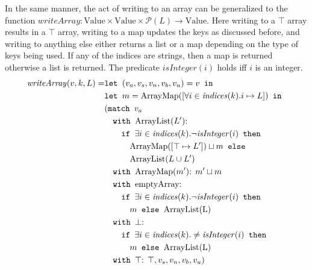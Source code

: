 In the same manner, the act of writing to an array can be generalized to the function $\mathit{writeArray}: \text{Value} \times \text{Value} \times \mathcal{P}(L) \rightarrow \text{Value}$. Here writing to a $\top$ array results in a $\top$ array, writing to a map updates the keys as discussed before, and writing to anything else either returns a list or a map depending on the type of keys being used. If any of the indices are strings, then a map is returned otherwise a list is returned. The predicate $\mathit{isInteger}(i)$ holds iff $i$ is an integer.
\begin{align}
\mathit{writeArray}(v, k, L) =       & \texttt{let } (v_a,v_s,v_n,v_b,v_u) = v \texttt{ in }\notag\\
                            &\texttt{let } m = \text{ArrayMap}([\forall i \in \mathit{indices}(k). i \mapsto L]) \texttt{ in }\notag\\
                            &(\texttt{match }v_a \notag\\
                            & \quad \texttt{with }\text{ArrayList}(L')\text{: } \notag\\
                            &\quad\quad \texttt{if }\exists i \in \mathit{indices}(k).\neg\mathit{isInteger}(i)\texttt{ then } \notag\\
                            &\quad\quad\quad \text{ArrayMap}([\top \mapsto L'])\sqcup m \texttt{ else } \notag\\
                            &\quad\quad\quad \text{ArrayList}(L\cup L')\notag\\
                            & \quad \texttt{with }\text{ArrayMap}(m')\text{: } m'\sqcup m\notag\\
                            & \quad \texttt{with }\text{emptyArray}\text{: } \notag\\
                            & \quad\quad\texttt{if }\exists i \in \mathit{indices}(k).\neg\mathit{isInteger}(i)\texttt{ then } \notag\\
                            &\quad\quad\quad m \texttt{ else } \text{ArrayList(L)}\notag\\
                            & \quad \texttt{with }\bot\text{: }  \notag\\
                            & \quad\quad\texttt{if }\exists i \in \mathit{indices}(k).\neq\mathit{isInteger}(i)\texttt{ then } \notag\\
                            &\quad\quad\quad m \texttt{ else } \text{ArrayList(L)}\notag\\
                            & \quad \texttt{with }\top\text{: } \top, v_s, v_n, v_b, v_u)
\end{align}

